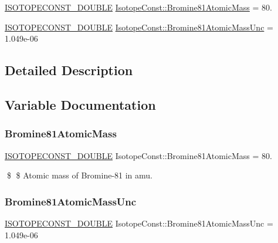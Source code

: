 \begin{DoxyCompactItemize}
\item 
\mbox{\hyperlink{group___isotope_const-_macros_ga8f45a7272ce02c0b4c65c44636ed719a}{I\+S\+O\+T\+O\+P\+E\+C\+O\+N\+S\+T\+\_\+\+D\+O\+U\+B\+LE}} \mbox{\hyperlink{group___isotope_const-_bromine-_br81_ga51116ff6a6994d1b441f614f8c280e2e}{Isotope\+Const\+::\+Bromine81\+Atomic\+Mass}} = 80.
\item 
\mbox{\hyperlink{group___isotope_const-_macros_ga8f45a7272ce02c0b4c65c44636ed719a}{I\+S\+O\+T\+O\+P\+E\+C\+O\+N\+S\+T\+\_\+\+D\+O\+U\+B\+LE}} \mbox{\hyperlink{group___isotope_const-_bromine-_br81_gaedd3147ec2be9618844f5ee3bba720be}{Isotope\+Const\+::\+Bromine81\+Atomic\+Mass\+Unc}} = 1.\+049e-\/06
\end{DoxyCompactItemize}


\subsection{Detailed Description}


\subsection{Variable Documentation}
\mbox{\label{group___isotope_const-_bromine-_br81_ga51116ff6a6994d1b441f614f8c280e2e}} 
\subsubsection{\texorpdfstring{Bromine81\+Atomic\+Mass}{Bromine81AtomicMass}}
{\footnotesize\ttfamily \mbox{\hyperlink{group___isotope_const-_macros_ga8f45a7272ce02c0b4c65c44636ed719a}{I\+S\+O\+T\+O\+P\+E\+C\+O\+N\+S\+T\+\_\+\+D\+O\+U\+B\+LE}} Isotope\+Const\+::\+Bromine81\+Atomic\+Mass = 80.}

\$ \$ Atomic mass of Bromine-\/81 in amu. \mbox{\label{group___isotope_const-_bromine-_br81_gaedd3147ec2be9618844f5ee3bba720be}} 
\subsubsection{\texorpdfstring{Bromine81\+Atomic\+Mass\+Unc}{Bromine81AtomicMassUnc}}
{\footnotesize\ttfamily \mbox{\hyperlink{group___isotope_const-_macros_ga8f45a7272ce02c0b4c65c44636ed719a}{I\+S\+O\+T\+O\+P\+E\+C\+O\+N\+S\+T\+\_\+\+D\+O\+U\+B\+LE}} Isotope\+Const\+::\+Bromine81\+Atomic\+Mass\+Unc = 1.\+049e-\/06}

